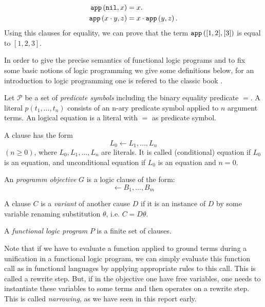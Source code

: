 \begin{align*}
    \mathtt{app}\left(\mathtt{nil},x\right) &= x. \\
    \mathtt{app}\left(x \cdot y,z\right) &= x \cdot \mathtt{app}\left(y,z\right).
\end{align*}
Using this clauses for equality, we can prove that the term $\mathtt{app}\left([1,2],[3]\right)$ is equal to $[1,2,3]$.

In order to give the precise semantics of functional logic programs and to fix some basic notions of logic programming we give some definitions below, for an introduction to logic programming one is refered to the classic book \cite{Clocksin:1984:PP:2343}.

\begin{definition}
    Let $\mathcal{P}$ be a set of \textit{predicate symbols} including the binary equality predicate $=$. A literal $p(t_1, \dots, t_n)$ consists of an n-ary predicate symbol applied to $n$ argument terms. An logical equation is a literal with $=$ as predicate symbol.
\end{definition}

\begin{definition}
    A clause has the form
    $$L_0 \leftarrow L_1, \dots, L_n$$
    $(n \geq 0)$, where $L_0, L_1, \dots, L_n$ are literals. It is called (conditional) equation if $L_0$ is an equation, and unconditional equation if $L_0$ is an equation and $n = 0$.
\end{definition}

\begin{definition}
    An \textit{programm objective} $G$ is a logic clause of the form:
    $$\leftarrow B_1, \dots, B_m$$
\end{definition}

A clause $C$ is a \textit{variant} of another cause $D$ if it is an instance of $D$ by some variable renaming substitution $\theta$, i.e. $C = D \theta$.

\begin{definition}
    A \textit{functional logic program} $P$ is a finite set of clauses.
\end{definition}

Note that if we have to evaluate a function applied to ground terms during a unification in a functional logic program, we can simply evaluate this function call as in functional languages by applying appropriate rules to this call. This is called a rewrite step. But, if in the objective one have free variables, one needs to instantiate these variables to some terms and then operates on a rewrite step. This is called \textit{narrowing}, as we have seen in this report early.

